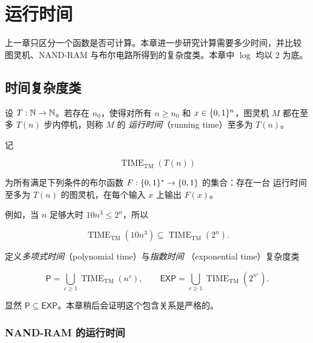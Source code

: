 \chapter{运行时间}
\label{chap:running-time}

\lecture
\label{lec:running-time}

上一章只区分一个函数是否可计算。本章进一步研究计算需要多少时间，并比较
图灵机、NAND-RAM 与布尔电路所得到的复杂度类。本章中 $\log$ 均以 $2$ 为底。

\section{时间复杂度类}

\begin{definition}[图灵机的运行时间]
  \label{def:tm-running-time}
  设 $T:\mathbb{N}\to\mathbb{N}$。若存在 $n_0$，使得对所有 $n\geq n_0$ 和
  $x\in\{0,1\}^n$，图灵机 $M$ 都在至多 $T(n)$ 步内停机，则称 $M$ 的
  \emph{运行时间}（running time）至多为 $T(n)$。
\end{definition}

\begin{definition}[图灵机时间类]
  \label{def:tm-time-class}
  记

  \[
    \operatorname{TIME}_{\mathrm{TM}}(T(n))
  \]

  为所有满足下列条件的布尔函数 $F:\{0,1\}^{*}\to\{0,1\}$ 的集合：存在一台
  运行时间至多为 $T(n)$ 的图灵机，在每个输入 $x$ 上输出 $F(x)$。
\end{definition}

例如，当 $n$ 足够大时 $10n^3\leq 2^n$，所以

\[
  \operatorname{TIME}_{\mathrm{TM}}(10n^3)
  \subseteq
  \operatorname{TIME}_{\mathrm{TM}}(2^n).
\]

\begin{definition}[多项式时间与指数时间]
  \label{def:p-and-exp}
  定义\emph{多项式时间}（polynomial time）与\emph{指数时间}
  （exponential time）复杂度类

  \[
    \mathsf P
      =\bigcup_{c\geq 1}\operatorname{TIME}_{\mathrm{TM}}(n^c),
    \qquad
    \mathsf{EXP}
      =\bigcup_{c\geq 1}\operatorname{TIME}_{\mathrm{TM}}(2^{n^c}).
  \]
\end{definition}

显然 $\mathsf P\subseteq\mathsf{EXP}$。本章稍后会证明这个包含关系是严格的。

\subsection{NAND-RAM 的运行时间}

